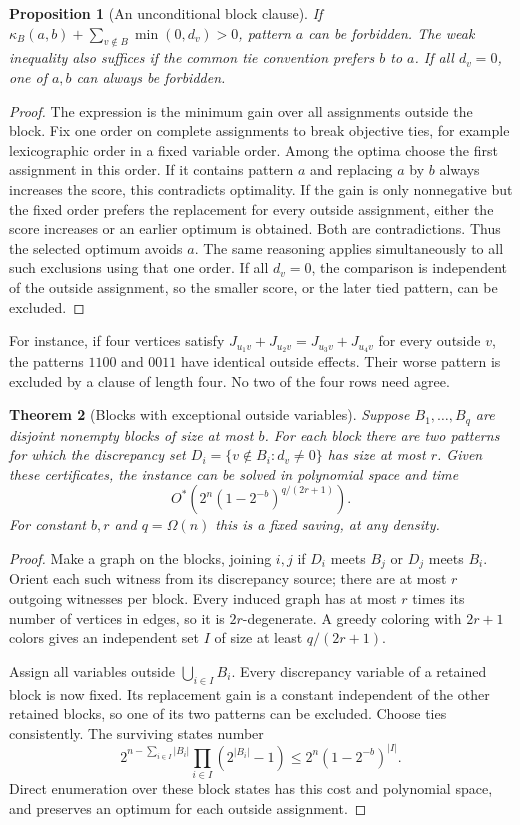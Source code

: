 \documentclass[11pt,a4paper]{article}
\newtheorem{theorem}{Theorem}[section]
\newtheorem{proposition}[theorem]{Proposition}
\theoremstyle{definition}
\theoremstyle{remark}
\newcommand{\Ostar}{O^{*}}
\begin{document}
\begin{proposition}[An unconditional block clause]\label{prop:block}
If $\kappa_B(a,b)+\sum_{v\notin B}\min(0,d_v)>0$, pattern $a$ can be
forbidden. The weak inequality also suffices if the common tie convention
prefers $b$ to $a$. If all $d_v=0$, one of $a,b$ can always be forbidden.
\end{proposition}
\begin{proof}
The expression is the minimum gain over all assignments outside the block.
Fix one order on complete assignments to break objective ties, for example
lexicographic order in a fixed variable order. Among the optima choose the
first assignment in this order. If it contains pattern $a$ and replacing
$a$ by $b$ always increases the score, this contradicts optimality. If the
gain is only nonnegative but the fixed order prefers the replacement for
every outside assignment, either the score increases or an earlier optimum
is obtained. Both are contradictions. Thus the selected optimum avoids
$a$. The same reasoning applies simultaneously to all such exclusions
using that one order. If all $d_v=0$, the comparison is independent of the
outside assignment, so the smaller score, or the later tied pattern, can
be excluded.
\end{proof}

For instance, if four vertices satisfy
$J_{u_1v}+J_{u_2v}=J_{u_3v}+J_{u_4v}$ for every outside $v$, the patterns
$1100$ and $0011$ have identical outside effects. Their worse pattern is
excluded by a clause of length four. No two of the four rows need agree.

\begin{theorem}[Blocks with exceptional outside variables]\label{thm:blocks}
Suppose $B_1,\ldots,B_q$ are disjoint nonempty blocks of size at most $b$.
For each block there are two patterns for which the discrepancy set
$D_i=\{v\notin B_i:d_v\ne0\}$ has size at most $r$.
Given these certificates, the instance can be solved in polynomial space
and time
\[
 \Ostar\left(2^n(1-2^{-b})^{q/(2r+1)}\right).
\]
For constant $b,r$ and $q=\Omega(n)$ this is a fixed saving, at any density.
\end{theorem}
\begin{proof}
Make a graph on the blocks, joining $i,j$ if $D_i$ meets $B_j$ or $D_j$
meets $B_i$. Orient each such witness from its discrepancy source; there
are at most $r$ outgoing witnesses per block. Every induced graph has at
most $r$ times its number of vertices in edges, so it is $2r$-degenerate.
A greedy coloring with $2r+1$ colors gives an independent set $I$ of size
at least $q/(2r+1)$.

Assign all variables outside $\bigcup_{i\in I}B_i$. Every discrepancy
variable of a retained block is now fixed. Its replacement gain is a
constant independent of the other retained blocks, so one of its two
patterns can be excluded. Choose ties consistently. The surviving states
number
\[
 2^{n-\sum_{i\in I}|B_i|}\prod_{i\in I}(2^{|B_i|}-1)
 \le2^n(1-2^{-b})^{|I|}.
\]
Direct enumeration over these block states has this cost and polynomial
space, and preserves an optimum for each outside assignment.
\end{proof}
\end{document}
